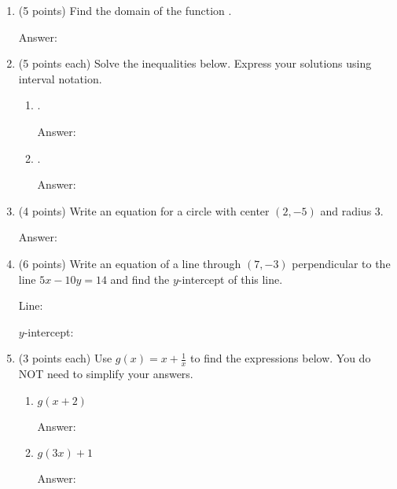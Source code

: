 \documentclass[12pt]{article}
\begin{document}
\begin{enumerate}
\item (5 points) Find the domain of the function .\\
\begin{flushright}{ Answer:\underline{\hspace{2in}}}\end{flushright}
\vfill
\newpage
\item (5 points each) Solve the inequalities below. Express your solutions using interval notation.
\begin{enumerate}
\item  \scalebox{1.2}{$\vert 2x+1 \vert +3 > 5$}.
\begin{flushright}{ Answer:\underline{\hspace{2in}}}\end{flushright}
\vfill
\item  {}.
\begin{flushright}{ Answer:\underline{\hspace{2in}}}\end{flushright}
\vfill
\end{enumerate}
\item (4 points) Write an equation for a circle with center $(2,-5)$ and radius 3.
\begin{flushright}{ Answer:\underline{\hspace{2in}}}\end{flushright}
\vspace{.3in}
\item (6 points) Write an equation of a line through $(7,-3)$ perpendicular to the line $5x-10y=14$ and find the $y$-intercept of this line.
\begin{flushright}{ Line:\underline{\hspace{2in}}}\end{flushright}
\begin{flushright}{ $y$-intercept:\underline{\hspace{2in}}}\end{flushright}
\vfill
\newpage	
\item (3 points each) Use $g(x)=x+\frac{1}{x}$ to find the expressions below. You do NOT need to simplify your answers.
\begin{enumerate}
\item $g(x+2)$\\ 
\begin{flushright}{ Answer:\underline{\hspace{2in}}}\end{flushright}
\item $g(3x)+1$\\
\begin{flushright}{ Answer:\underline{\hspace{2in}}}\end{flushright}
\end{enumerate}


\end{enumerate}
\end{document}
